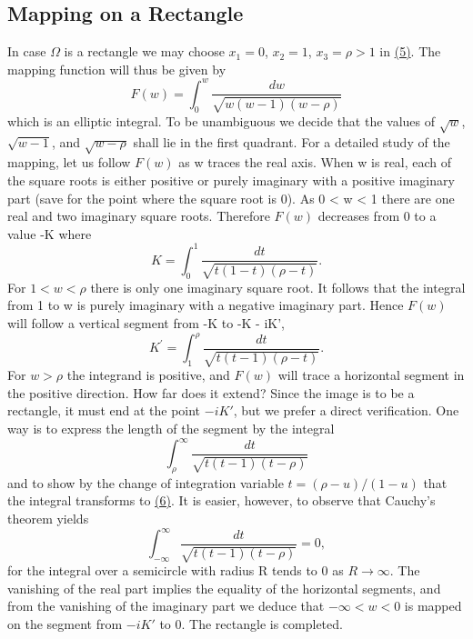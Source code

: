 \setcounter{section}{2}\setcounter{subsection}{2}\subsection{Mapping on a Rectangle}\label{sec:6.2.3}
In case $\Omega$ is a rectangle we may choose $x_{1} = 0$, $x_{2} = 1$, $x_{3} = \rho > 1$ in \hyperref[eq:6.5]{(5)}. The mapping function will thus be given by
\begin{equation*}
F (w) = \int_ {0} ^ {w} \frac {d w}{\sqrt {w (w - 1) (w - \rho)}}
\end{equation*}
which is an elliptic integral. To be unambiguous we decide that the values of $\sqrt{w}$, $\sqrt{w-1}$, and $\sqrt{w-\rho}$ shall lie in the first quadrant. For a detailed study of the mapping, let us follow $F(w)$ as w traces the real axis. When w is real, each of the square roots is either positive or purely imaginary with a positive imaginary part (save for the point where the square root is 0). As 0 < w < 1 there are one real and two imaginary square roots. Therefore $F(w)$ decreases from 0 to a value -K where
\begin{equation*}
K = \int_ {0} ^ {1} \frac {d t}{\sqrt {t (1 - t) (\rho - t)}}.\tag{6}\label{eq:6.6}
\end{equation*}
For $1 < w < \rho$ there is only one imaginary square root. It follows that the integral from 1 to w is purely imaginary with a negative imaginary part. Hence $F(w)$ will follow a vertical segment from -K to -K - iK',
\begin{equation*}
K ^ {\prime} = \int_ {1} ^ {\rho} \frac {d t}{\sqrt {t (t - 1) (\rho - t)}}.
\end{equation*}
For $w > \rho$ the integrand is positive, and $F(w)$ will trace a horizontal segment in the positive direction. How far does it extend? Since the image is to be a rectangle, it must end at the point $-iK'$, but we prefer a direct verification. One way is to express the length of the segment by the integral
\begin{equation*}
\int_ {\rho} ^ {\infty} \frac {d t}{\sqrt {t (t - 1) (t - \rho)}}
\end{equation*}
and to show by the change of integration variable $t = (\rho - u)/(1 - u)$ that the integral transforms to \hyperref[eq:6.6]{(6)}. It is easier, however, to observe that Cauchy's theorem yields
\begin{equation*}
\int_ {- \infty} ^ {\infty} \frac {d t}{\sqrt {t (t - 1) (t - \rho)}} = 0,
\end{equation*}
for the integral over a semicircle with radius R tends to 0 as $R \to \infty$. The vanishing of the real part implies the equality of the horizontal segments, and from the vanishing of the imaginary part we deduce that $-\infty < w < 0$ is mapped on the segment from $-iK'$ to 0. The rectangle is completed.

